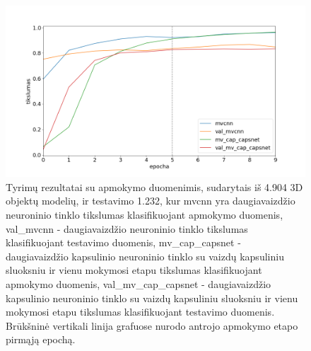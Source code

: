 \begin{figure}[H]
	\centering
	\includegraphics[scale=0.5]{img/less_data_v1.png}
	\caption{
		Tyrimų rezultatai su apmokymo duomenimis, sudarytais iš 4.904 3D objektų modelių, ir testavimo 1.232, kur mvcnn yra daugiavaizdžio neuroninio tinklo tikslumas klasifikuojant apmokymo duomenis, val\_mvcnn - daugiavaizdžio neuroninio tinklo tikslumas klasifikuojant testavimo duomenis, mv\_cap\_capsnet - daugiavaizdžio kapsulinio neuroninio tinklo su vaizdų kapsuliniu sluoksniu ir vienu mokymosi etapu tikslumas klasifikuojant apmokymo duomenis, val\_mv\_cap\_capsnet - daugiavaizdžio kapsulinio neuroninio tinklo su vaizdų kapsuliniu sluoksniu ir vienu mokymosi etapu tikslumas klasifikuojant testavimo duomenis.	Brūkšninė vertikali linija grafuose nurodo antrojo apmokymo etapo pirmąją epochą.
	}
	\label{img:less_datav1}
\end{figure}


